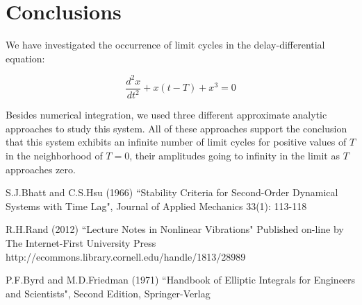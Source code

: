\documentclass[12pt]{article}
\begin{document}
\newpage
\section{Conclusions}

We have investigated the occurrence of limit cycles in the delay-differential equation:

\begin{equation}
\frac{d^2x}{dt^2}+x(t-T)+x^3 = 0
\label{1a} 
\end{equation}

Besides numerical integration, we used three different approximate analytic approaches to study this system.
All of these approaches support the conclusion that this system exhibits an infinite number of limit cycles for positive values of $T$ in the neighborhood of $T = 0$, their amplitudes going to infinity in the limit as $T$ approaches zero. 

\begin{thebibliography}{99}
	
	
	
	 S.J.Bhatt and C.S.Hsu (1966) ``Stability Criteria for Second-Order Dynamical Systems with Time Lag", 
	Journal of Applied Mechanics 33(1): 113-118 
	
	 R.H.Rand (2012) ``Lecture Notes in Nonlinear Vibrations"
	Published on-line by The Internet-First University Press 
	http://ecommons.library.cornell.edu/handle/1813/28989
	
	 P.F.Byrd and M.D.Friedman (1971) ``Handbook of Elliptic Integrals for Engineers and Scientists",
	Second Edition, Springer-Verlag 
	
\end{thebibliography}
\end{document}

